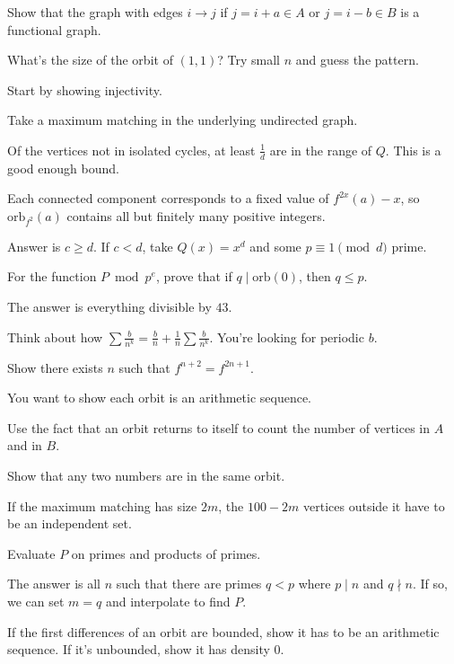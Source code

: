 \documentclass[11pt,paper=letter]{scrartcl}
\newcommand{\orb}[1]{\mathrm{orb}(#1)}
\newcommand{\orbf}[2]{\mathrm{orb}_{#1}(#2)}
\begin{document}
\begin{enumthin}
\item \label{h:29} Show that the graph with edges $i \to j$ if $j = i + a \in A$ or $j = i - b \in B$ is a functional graph.
\item \label{h:20} What's the size of the orbit of $(1, 1)$? Try small $n$ and guess the pattern.
\item \label{h:3} Start by showing injectivity.
\item \label{h:12} Take a maximum matching in the underlying undirected graph.
\item \label{h:26} Of the vertices not in isolated cycles, at least $\frac1d$ are in the range of $Q$. This is a good enough bound.
\item \label{h:16} Each connected component corresponds to a fixed value of $f^{2x}(a) - x$, so $\orbf{f^2}{a}$ contains all but finitely many positive integers.
\item \label{h:24} Answer is $c \ge d$. If $c < d$, take $Q(x) = x^d$ and some $p \equiv 1 \pmod d$ prime.
\item \label{h:18} For the function $P \bmod p^e$, prove that if $q \mid \orb{0}$, then $q \le p$.
\item \label{h:2} The answer is everything divisible by $43$.
\item \label{h:10} Think about how $\sum \frac{b}{n^k} = \frac{b}{n} + \frac{1}{n}\sum \frac{b}{n^k}$. You're looking for periodic $b$.
\item \label{h:28} Show there exists $n$ such that $f^{n + 2} = f^{2n + 1}$.
\item \label{h:22} You want to show each orbit is an arithmetic sequence.
\item \label{h:30} Use the fact that an orbit returns to itself to count the number of vertices in $A$ and in $B$.
\item \label{h:4} Show that any two numbers are in the same orbit.
\item \label{h:13} If the maximum matching has size $2m$, the $100 - 2m$ vertices outside it have to be an independent set.
\item \label{h:8} Evaluate $P$ on primes and products of primes.
\item \label{h:17} The answer is all $n$ such that there are primes $q < p$ where $p \mid n$ and $q \nmid n$. If so, we can set $m = q$ and interpolate to find $P$.
\item \label{h:23} If the first differences of an orbit are bounded, show it has to be an arithmetic sequence. If it's unbounded, show it has density $0$.

\end{enumthin}
\end{document}
